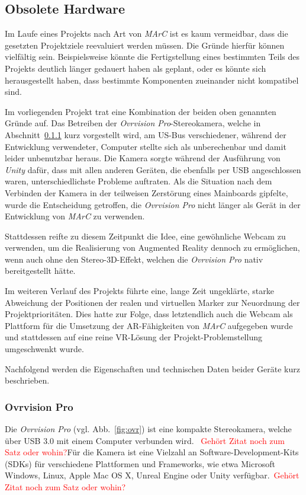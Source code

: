 \subsection{Obsolete Hardware}\label{sec:obsoleteHardware}
Im Laufe eines Projekts nach Art von \emph{MArC} ist es kaum vermeidbar, dass die gesetzten Projektziele reevaluiert werden müssen. Die Gründe hierfür können vielfältig sein. Beispielsweise könnte die Fertigstellung eines bestimmten Teils des Projekts deutlich länger gedauert haben als geplant, oder es könnte sich herausgestellt haben, dass bestimmte Komponenten zueinander nicht kompatibel sind.

Im vorliegenden Projekt trat eine Kombination der beiden oben genannten Gründe auf. Das Betreiben der \emph{Ovrvision Pro}-Stereokamera, welche in Abschnitt~\ref{sec:ovrvision} kurz vorgestellt wird, am US-Bus verschiedener, während der Entwicklung verwendeter, Computer stellte sich als unberechenbar und damit leider unbenutzbar heraus. Die Kamera sorgte während der Ausführung von \textit{Unity} dafür, dass mit allen anderen Geräten, die ebenfalls per USB angeschlossen waren, unterschiedlichste Probleme auftraten. Als die Situation nach dem Verbinden der Kamera in der teilweisen Zerstörung eines Mainboards gipfelte, wurde die Entscheidung getroffen, die \emph{Ovrvision Pro} nicht länger als Gerät in der Entwicklung von \emph{MArC} zu verwenden.

Stattdessen reifte zu diesem Zeitpunkt die Idee, eine gewöhnliche Webcam zu verwenden, um die Realisierung von Augmented Reality dennoch zu ermöglichen, wenn auch ohne den Stereo-3D-Effekt, welchen die \emph{Ovrvision Pro} nativ bereitgestellt hätte.

Im weiteren Verlauf des Projekts führte eine, lange Zeit ungeklärte, starke Abweichung der Positionen der realen und virtuellen Marker zur Neuordnung der Projektprioritäten. Dies hatte zur Folge, dass letztendlich auch die Webcam als Plattform für die Umsetzung der AR-Fähigkeiten von \emph{MArC} aufgegeben wurde und stattdessen auf eine reine VR-Lösung der Projekt-Problemstellung umgeschwenkt wurde.

Nachfolgend werden die Eigenschaften und technischen Daten beider Geräte kurz beschrieben.
\subsubsection{Ovrvision Pro}\label{sec:ovrvision}
Die \emph{Ovrvision Pro} (vgl. Abb.~\ref{fig:ovr}) ist eine kompakte Stereokamera, welche über USB 3.0 mit einem Computer verbunden wird.~\cite{website:ovrvision}  \textcolor{red}{Gehört Zitat noch zum Satz oder wohin?}Für die Kamera ist eine Vielzahl an Software-Development-Kits (SDKs) für verschiedene Plattformen und Frameworks, wie etwa Microsoft Windows, Linux, Apple Mac OS X, Unreal Engine oder Unity verfügbar.~\cite{website:ovrvisionSetup}\textcolor{red}{Gehört Zitat noch zum Satz oder wohin?}


